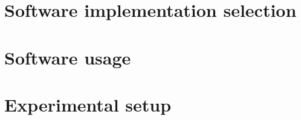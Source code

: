 

\section{Software implementation selection}
    \label{sec:software_implementation_selection}
    

\section{Software usage}
    \label{sec:software_usage}
    

\section{Experimental setup}
    \label{sec:experimental_setup}
    